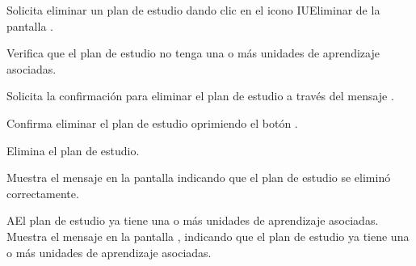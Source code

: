 \begin{UCtrayectoria}
	\UCpaso [\UCactor] Solicita eliminar un plan de estudio dando clic en el icono IUEliminar de la pantalla .
	
	\UCpaso [\UCsist] Verifica que el plan de estudio no tenga una o más unidades de aprendizaje asociadas. 
	
	\UCpaso [\UCsist] Solicita la confirmación para eliminar el plan de estudio a través del mensaje .
	
	\UCpaso [\UCactor] Confirma eliminar el plan de estudio oprimiendo el botón .
	
	\UCpaso [\UCsist] Elimina el plan de estudio.
	
	\UCpaso [\UCsist] Muestra el mensaje  en la pantalla  indicando que el plan de estudio se eliminó correctamente.	
	
\end{UCtrayectoria}

\begin{UCtrayectoriaA}{A}{El plan de estudio ya tiene una o más unidades de aprendizaje asociadas.}
	\UCpaso [\UCsist] Muestra el mensaje  en la pantalla , indicando que el plan de estudio ya tiene una o más unidades de aprendizaje asociadas. 
\end{UCtrayectoriaA}

